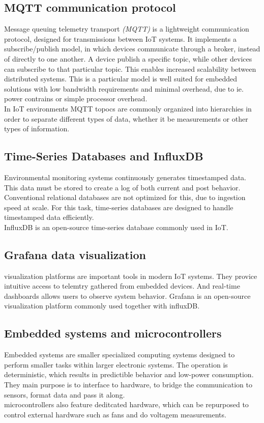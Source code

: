 \subsection{MQTT communication protocol}
Message queuing telemetry transport \textit{(MQTT)} is a lightweight communication protocol,
designed for transmissions between IoT systems. It implements a subscribe/publish model, in which
devices communicate through a broker, instead of directly to one another. A device publish
a specific topic, while other devices can subscribe to that particular topic. This enables
increased scalability between distributed systems. This is a particular model is well suited
for embedded solutions with low bandwidth requirements and minimal overhead, due to ie. power
contrains or simple processor overhead.\\ 
In IoT environments MQTT topocs are commonly organized into hierarchies in order to separate 
different types of data, whether it be measurements or other types of information. 

\subsection{Time-Series Databases and InfluxDB}
Environmental monitoring systems continuously generates timestamped data. This data must be 
stored to create a log of both current and post behavior. Conventional relational databases
are not optimized for this, due to ingestion speed at scale. For this task, time-series databases
are designed to handle timestamped data efficiently.\\
InfluxDB is an open-source time-series database commonly used in IoT. 

\subsection{Grafana data visualization}
visualization platforms are important tools in modern IoT systems. They provice intuitive
access to telemtry gathered from embedded devices. And real-time dashboards allows users to 
observe system behavior. Grafana is an open-source visualization platform commonly used 
together with influxDB.

\subsection{Embedded systems and microcontrollers}
Embedded systems are smaller specialized computing systems designed to perform
smaller tasks within larger electronic systems. The operation is deterministic, which
results in predictible behavior and low-power consumption. They main purpose is to interface
to hardware, to bridge the communication to sensors, format data and pass it along.\\
microcontrollers also feature deditcated hardware, which can be repurposed to control 
external hardware such as fans and do voltagem measurements. 

